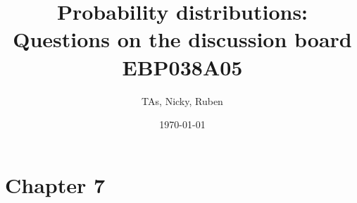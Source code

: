\documentclass[a4paper,11pt]{article}
\title{Probability distributions: Questions on the discussion board\\
EBP038A05
}
\author{TAs, Nicky, Ruben}
\date{\today}
\begin{document}
\maketitle
\tableofcontents

\section{Chapter 7}
\label{sec:chapter-7}

\end{document}
